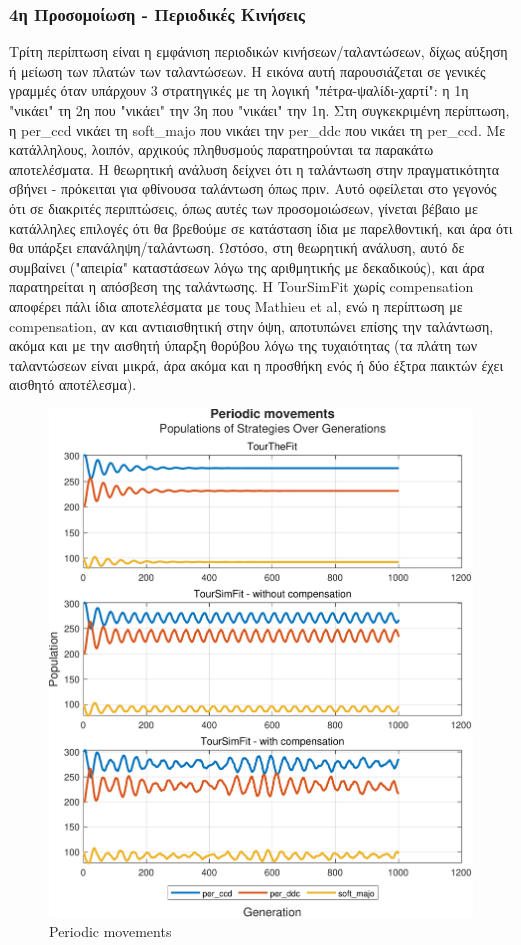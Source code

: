 \documentclass[12pt]{article}
\begin{document}
\subsubsection{4η Προσομοίωση - Περιοδικές Κινήσεις}
Τρίτη περίπτωση είναι η εμφάνιση περιοδικών κινήσεων/ταλαντώσεων, δίχως αύξηση ή μείωση των πλατών των ταλαντώσεων. Η εικόνα αυτή παρουσιάζεται σε γενικές γραμμές όταν υπάρχουν 3 στρατηγικές με τη λογική "πέτρα-ψαλίδι-χαρτί": η 1η "νικάει" τη 2η που "νικάει" την 3η που "νικάει" την 1η. Στη συγκεκριμένη περίπτωση, η per\_ccd νικάει τη soft\_majo που νικάει την per\_ddc που νικάει τη per\_ccd. Με κατάλληλους, λοιπόν, αρχικούς πληθυσμούς παρατηρούνται τα παρακάτω αποτελέσματα. Η θεωρητική ανάλυση δείχνει ότι η ταλάντωση στην πραγματικότητα σβήνει - πρόκειται για φθίνουσα ταλάντωση όπως πριν. Αυτό οφείλεται στο γεγονός ότι σε διακριτές περιπτώσεις, όπως αυτές των προσομοιώσεων, γίνεται βέβαιο με κατάλληλες επιλογές ότι θα βρεθούμε σε κατάσταση ίδια με παρελθοντική, και άρα ότι θα υπάρξει επανάληψη/ταλάντωση. Ωστόσο, στη θεωρητική ανάλυση, αυτό δε συμβαίνει ("απειρία" καταστάσεων λόγω της αριθμητικής με δεκαδικούς), και άρα παρατηρείται η απόσβεση της ταλάντωσης. Η TourSimFit χωρίς compensation αποφέρει πάλι ίδια αποτελέσματα με τους Mathieu et al, ενώ η περίπτωση με compensation, αν και αντιαισθητική στην όψη, αποτυπώνει επίσης την ταλάντωση, ακόμα και με την αισθητή ύπαρξη θορύβου λόγω της τυχαιότητας (τα πλάτη των ταλαντώσεων είναι μικρά, άρα ακόμα και η προσθήκη ενός ή δύο έξτρα παικτών έχει αισθητό αποτέλεσμα).
	\begin{figure}[h]
	      \centering
	      \includegraphics[scale=0.8]{Periodic movements.pdf}
	      \caption{Periodic movements}
	\end{figure}
\end{document}
